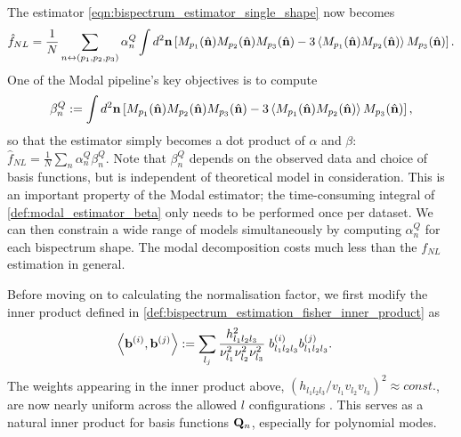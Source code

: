 The estimator \eqref{eqn:bispectrum_estimator_single_shape} now becomes
\begin{align}
	\hat{f}_{NL} = \frac{1}{N} \sum_{n \newline \leftrightarrow (p_1,p_2,p_3)} \alpha_n^Q \int d^2 \vv{n} \left[ M_{p_1}(\hat{\vv{n}}) M_{p_2}(\hat{\vv{n}}) M_{p_3}(\hat{\vv{n}}) - 3 \left< M_{p_1}(\hat{\vv{n}}) M_{p_2}(\hat{\vv{n}}) \right> M_{p_3}(\hat{\vv{n}})  \right].
\end{align}
One of the Modal pipeline's key objectives is to compute
\begin{align}
	\beta^Q_n := \int d^2 \mathbf{n} \left[ M_{p_1}(\hat{\mathbf{n}}) M_{p_2}(\hat{\mathbf{n}}) M_{p_3}(\hat{\mathbf{n}}) - 3 \left< M_{p_1}(\hat{\mathbf{n}}) M_{p_2}(\hat{\mathbf{n}}) \right> M_{p_3}(\hat{\mathbf{n}})  \right], \label{def:modal_estimator_beta}
\end{align}
so that the estimator simply becomes a dot product of $\alpha$ and $\beta$: $\hat{f}_{NL} = \frac{1}{N} \sum_n \alpha^Q_n \beta^Q_n$. Note that $\beta_n^Q$ depends on the observed data and choice of basis functions, but is independent of theoretical model in consideration. This is an important property of the Modal estimator; the time-consuming integral of \eqref{def:modal_estimator_beta} only needs to be performed once per dataset. We can then constrain a wide range of models simultaneously by computing $\alpha^Q_n$ for each bispectrum shape. The modal decomposition costs much less than the $f_{NL}$ estimation in general.

Before moving on to calculating the normalisation factor, we first modify the inner product defined in \eqref{def:bispectrum_estimation_fisher_inner_product} as
\begin{align}
	\left< \mathbf{b}^{(i)}, \mathbf{b}^{(j)} \right> &:= \sum_{l_j} \frac{h^2_{l_1 l_2 l_3}}{\nu_{l_1}^2 \nu_{l_2}^2 \nu_{l_3}^2 } \; b^{(i)}_{l_1 l_2 l_3} b^{(j)}_{l_1 l_2 l_3}.
\end{align}
The weights appearing in the inner product above, $(h_{l_1 l_2 l_3}/v_{l_1} v_{l_2} v_{l_3})^2\approx const.$, are now nearly uniform across the allowed $l$ configurations \cite{Fergusson2010general}. This serves as a natural inner product for basis functions $\mathbf{Q}_n$, especially for polynomial modes.

